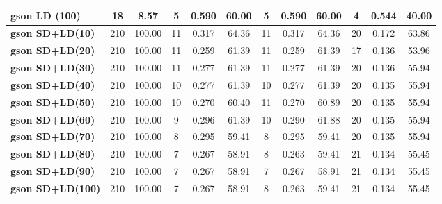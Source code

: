 \documentclass{ieeeaccess}
\begin{document}
\begin{table}[htbp]
\begin{tabular}{|l|c|c|ccc|ccc|ccc|}
\textbf{gson LD (100)} & 18 & 8.57 & 5 & 0.590 & 60.00 & 5 & 0.590 & 60.00 & 4 & 0.544 & 40.00 \\
\hline
\textbf{gson SD+LD(10)} & 210 & 100.00 & 11 & \cellcolor[HTML]{fef9e4}0.317 & \cellcolor[HTML]{fef9e4}64.36 & 11 & \cellcolor[HTML]{fef9e4}0.317 & \cellcolor[HTML]{fef9e4}64.36 & 20 & \cellcolor[HTML]{fef9e4}0.172 & \cellcolor[HTML]{fef9e4}63.86 \\
\textbf{gson SD+LD(20)} & 210 & 100.00 & 11 & 0.259 & 61.39 & 11 & 0.259 & 61.39 & 17 & 0.136 & 53.96 \\
\textbf{gson SD+LD(30)} & 210 & 100.00 & 11 & 0.277 & 61.39 & 11 & 0.277 & 61.39 & 20 & 0.136 & 55.94 \\
\textbf{gson SD+LD(40)} & 210 & 100.00 & 10 & 0.277 & 61.39 & 10 & 0.277 & 61.39 & 20 & 0.135 & 55.94 \\
\textbf{gson SD+LD(50)} & 210 & 100.00 & 10 & 0.270 & 60.40 & 11 & 0.270 & 60.89 & 20 & 0.135 & 55.94 \\
\textbf{gson SD+LD(60)} & 210 & 100.00 & 9 & 0.296 & 61.39 & 10 & 0.290 & 61.88 & 20 & 0.135 & 55.94 \\
\textbf{gson SD+LD(70)} & 210 & 100.00 & 8 & 0.295 & 59.41 & 8 & 0.295 & 59.41 & 20 & 0.135 & 55.94 \\
\textbf{gson SD+LD(80)} & 210 & 100.00 & 7 & 0.267 & 58.91 & 8 & 0.263 & 59.41 & 21 & 0.134 & 55.45 \\
\textbf{gson SD+LD(90)} & 210 & 100.00 & 7 & 0.267 & 58.91 & 7 & 0.267 & 58.91 & 21 & 0.134 & 55.45 \\
\textbf{gson SD+LD(100)} & 210 & 100.00 & 7 & 0.267 & 58.91 & 8 & 0.263 & 59.41 & 21 & 0.134 & 55.45 \\
\hline
\end{tabular}
\end{table}
\end{document}
